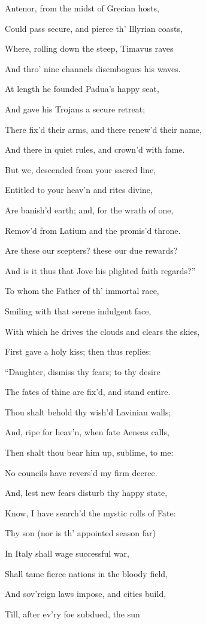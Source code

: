 Antenor, from the midst of Grecian hosts,

Could pass secure, and pierce th’ Illyrian coasts,

Where, rolling down the steep, Timavus raves

And thro’ nine channels disembogues his waves.

At length he founded Padua’s happy seat,

And gave his Trojans a secure retreat;

There fix’d their arms, and there renew’d their name,

And there in quiet rules, and crown’d with fame.

But we, descended from your sacred line,

Entitled to your heav’n and rites divine,

Are banish’d earth; and, for the wrath of one,

Remov’d from Latium and the promis’d throne.

Are these our scepters? these our due rewards?

And is it thus that Jove his plighted faith regards?”

To whom the Father of th’ immortal race,

Smiling with that serene indulgent face,

With which he drives the clouds and clears the skies,

First gave a holy kiss; then thus replies:

“Daughter, dismiss thy fears; to thy desire

The fates of thine are fix’d, and stand entire.

Thou shalt behold thy wish’d Lavinian walls;

And, ripe for heav’n, when fate Aeneas calls,

Then shalt thou bear him up, sublime, to me:

No councils have revers’d my firm decree.

And, lest new fears disturb thy happy state,

Know, I have search’d the mystic rolls of Fate:

Thy son (nor is th’ appointed season far)

In Italy shall wage successful war,

Shall tame fierce nations in the bloody field,

And sov’reign laws impose, and cities build,

Till, after ev’ry foe subdued, the sun

